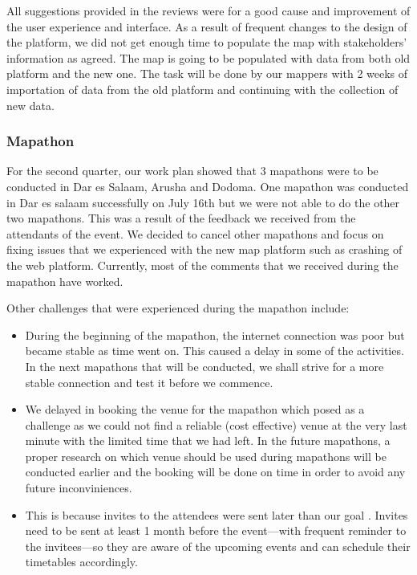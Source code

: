 \documentclass[a4paper,12pt,twoside]{article}
\begin{document}
All suggestions provided in the reviews were for a good cause and improvement of the user experience and interface. As a result of frequent changes to the design of the platform, we did not get enough time to populate the map with stakeholders’ information as agreed. The map is going to be populated with data from both old platform and the new one. The task will be done by our mappers with 2 weeks of importation of data from the old platform and continuing with the collection of new data.

\subsubsection{Mapathon}
For the second quarter, our work plan showed that 3 mapathons were to be conducted in Dar es Salaam, Arusha and Dodoma. One mapathon was conducted in Dar es salaam successfully on July 16th but we were not able to do the other two mapathons. This was a result of the feedback we received from the attendants of the event. We decided to cancel other mapathons and focus on fixing issues that we experienced with the new map platform such as crashing of the web platform. Currently, most of the comments that we received during the mapathon have worked.

Other challenges that were experienced during the mapathon include:
\begin{itemize}
    \item \color[OMDTZblue]{Internet connection:} During the beginning of the mapathon, the internet connection was poor but became stable as time went on. This caused a delay in some of the activities. In the next mapathons that will be conducted, we shall strive for a more stable connection and test it before we commence.
    
    \item \color[OMDTZblue]{Venue of the mapathon:} We delayed in booking the venue for the mapathon which posed as a challenge as we could not find a reliable (cost effective) venue at the very last minute with the limited time that we had left. In the future mapathons, a proper research on which venue should be used during mapathons will be conducted earlier and the booking will be done on time in order to avoid any future inconviniences.
    
    \item \color[OMDTZblue]{Attendance to the mapathon was lower than expected:} This is because invites to the attendees were sent later than our goal . Invites need to be sent at least 1 month before the event---with frequent reminder to the invitees---so they are aware of the upcoming events and can schedule their timetables accordingly.
\end{itemize}
\end{document}
